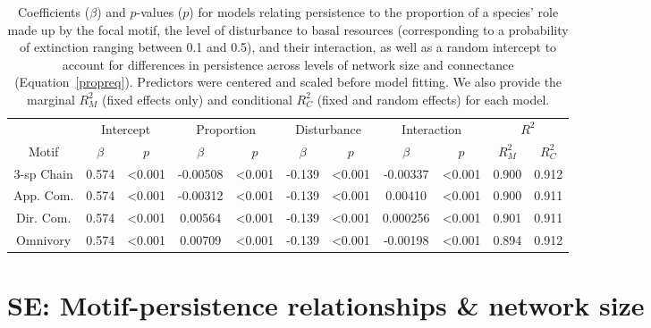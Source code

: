 \documentclass[12pt]{article}
\begin{document}
\begin{spacing}{2.0}
    
    \begin{table}[h!]
        \centering
        \caption{Coefficients ($\beta$) and $p$-values ($p$) for models relating persistence to the proportion of a species' role made up by the focal motif, the level of disturbance to basal resources (corresponding to a probability of extinction ranging between 0.1 and 0.5), and their interaction, as well as a random intercept to account for differences in persistence across levels of network size and connectance (Equation~\ref{propreq}). Predictors were centered and scaled before model fitting. We also provide the marginal $R^2_M$ (fixed effects only) and conditional $R^2_C$ (fixed and random effects) for each model.}
        \label{tab:proportion}                \footnotesize
        \begin{tabular}{c|c c | c c | c c | c c | c c |}
        & \multicolumn{2}{c|}{Intercept} & \multicolumn{2}{c|}{Proportion} & \multicolumn{2}{c|}{Disturbance} & \multicolumn{2}{c|}{Interaction} & \multicolumn{2}{c|}{$R^2$} \\
        Motif & $\beta$ & $p$ & $\beta$ & $p$ & $\beta$ & $p$ & $\beta$ & $p$ & $R^2_M$ & $R^2_C$ \\
        \hline
        3-sp Chain & 0.574 & \textless0.001 & -0.00508 & \textless0.001 & -0.139 & \textless0.001 & -0.00337 & \textless0.001 & 0.900 & 0.912 \\
        App. Com. & 0.574 & \textless0.001 & -0.00312 & \textless0.001 & -0.139 & \textless0.001 & 0.00410 & \textless0.001 & 0.900 & 0.911 \\
        Dir. Com. & 0.574 & \textless0.001 & 0.00564 & \textless0.001 & -0.139 & \textless0.001 & 0.000256 & \textless0.001 & 0.901 & 0.911 \\
        Omnivory & 0.574 & \textless0.001 & 0.00709 & \textless0.001 & -0.139 & \textless0.001 & -0.00198 & \textless0.001 & 0.894 & 0.912 \\
        \end{tabular}
    \end{table}        
\clearpage     


\section{SE: Motif-persistence relationships \& network size}


\end{spacing}
\end{document}
